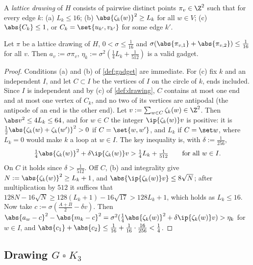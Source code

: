 \begin{definition}\label{def:drawing}
A \emph{lattice drawing} of $H$ consists of pairwise distinct points $\pi_v\in\Z^2$ such that for every edge $k$: (a) $L_k\le16$; (b) $\abs{\zeta_k(w)}^2\ge L_k$ for all $w\in V$; (c) $\abs{C_k}\le1$, or $C_k=\set{u_{k'},v_{k'}}$ for some edge $k'$.
\end{definition}

\begin{lemma}\label{lem:disks}
Let $\pi$ be a lattice drawing of $H$, $0<\sigma\le\frac1{16}$ and $\sigma(\abs{\pi_{v,1}}+\abs{\pi_{v,2}})\le\frac1{16}$ for all $v$. Then $a_v:=\sigma\pi_v$, $\eta_k:=\sigma^2(\frac14L_k+\frac1{512})$ is a valid gadget.
\end{lemma}

\begin{proof}
Conditions (a) and (b) of \cref{def:gadget} are immediate. For (c) fix $k$ and an independent $I$, and let $C\subset I$ be the vertices of $I$ on the circle of $k$, ends included. Since $I$ is independent and by (c) of \cref{def:drawing}, $C$ contains at most one end and at most one vertex of $C_k$, and no two of its vertices are antipodal (the antipode of an end is the other end). Let $v:=\sum_{w\in C}\zeta_k(w)\in\Z^2$. Then $\abs v^2\le4L_k\le64$, and for $w\in C$ the integer $\ip{\zeta_k(w)}v$ is positive: it is $\frac12\abs{\zeta_k(w)+\zeta_k(w')}^2>0$ if $C=\set{w,w'}$, and $L_k$ if $C=\set w$, where $L_k=0$ would make $k$ a loop at $w\in I$. The key inequality is, with $\delta:=\frac1{256}$,
\[
\tfrac14\abs{\zeta_k(w)}^2+\delta\ip{\zeta_k(w)}v>\tfrac14L_k+\tfrac1{512}\qquad\text{for all }w\in I.
\]
On $C$ it holds since $\delta>\frac1{512}$. Off $C$, (b) and integrality give $N:=\abs{\zeta_k(w)}^2\ge L_k+1$, and $\abs{\ip{\zeta_k(w)}v}\le8\sqrt N$; after multiplication by $512$ it suffices that $128N-16\sqrt N\ge128(L_k+1)-16\sqrt{17}>128L_k+1$, which holds as $L_k\le16$. Now take $c:=\sigma(\frac{A+B}2-\delta v)$. Then $\abs{a_w-c}^2-\abs{m_k-c}^2=\sigma^2(\frac14\abs{\zeta_k(w)}^2+\delta\ip{\zeta_k(w)}v)>\eta_k$ for $w\in I$, and $\abs{c_1}+\abs{c_2}\le\frac1{16}+\frac1{16}\cdot\frac{16}{256}<\frac14$.
\end{proof}

\subsection{\texorpdfstring{Drawing $G\mathbin{\square}K_3$}{Drawing G box K3}}\label{sec:layout}

